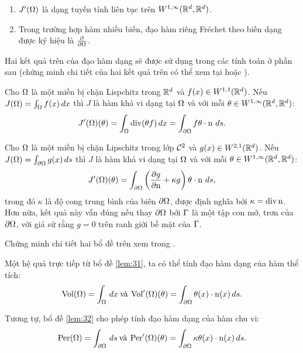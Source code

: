 \documentclass[
12pt, %
oneside, %
english, %
onehalfspacing, %
nolistspacing, %
headsepline, %
addchap,
]{MastersDoctoralThesis} %
\begin{document}
\begin{rem}\leavevmode
\begin{enumerate}[noitemsep,topsep=0pt]
	\item $J'(\Omega)$ là dạng tuyến tính liên tục trên $W^{1,\infty}(\mathbb R^d,\mathbb R^d)$.
	\item Trong trường hợp hàm nhiều biến, đạo hàm riêng Fr\'echet theo biến dạng được ký hiệu là $\frac{\partial}{\partial{\Omega}}$.
\end{enumerate}
\end{rem}

Hai kết quả trên của đạo hàm dạng sẽ được sử dụng trong các tính toán ở phần sau (chứng minh chi tiết của hai kết quả trên có thể xem tại \cite{AJT04} hoặc \cite{HP18}).

\begin{lem} \label{lem:31}
Cho $\Omega$ là một miền bị chặn Lispchitz trong $\mathbb R^d$ và $f(x) \in W^{1,1}(\mathbb R^d)$. Nếu $J(\Omega)=\int_{\Omega}f(x)\,dx$ thì $J$ là hàm khả vi dạng tại $\Omega$ và với mỗi $\theta \in W^{1,\infty}(\mathbb R^d,\mathbb R^d)$:
$$J'(\Omega)(\theta)=\int_{\Omega} \operatorname{div} (\theta f)\,dx=\int_{\partial{\Omega}} f \theta\cdot\operatorname{n} \,ds. $$
\end{lem}

\begin{lem}\label{lem:32}
Cho $\Omega$ là một miền bị chặn Lipschitz trong lớp $\mathcal C^2$ và $g(x) \in W^{2,1}(\mathbb R^d)$. Nếu $J(\Omega)=\int_{\partial{\Omega}}g(x)\,ds$ thì $J$ là hàm khả vi dạng tại $\Omega$ và với mỗi $\theta \in W^{1,\infty}(\mathbb R^d,\mathbb R^d)$:
$$ J'(\Omega)(\theta)=\int_{\partial{\Omega}} \left( \frac{\partial{g}}{\partial{\operatorname{n}}}+\kappa g \right) \theta\cdot\operatorname{n} \,ds, $$
trong đó $\kappa$ là độ cong trung bình của biên $\partial{\Omega}$, được định nghĩa bởi $\kappa= \operatorname{div} \operatorname{n}$.
Hơn nữa, kết quả này vẫn đúng nếu thay $\partial{\Omega}$ bởi $\Gamma$ là một tập con mở, trơn của $\partial{\Omega}$, với giả sử rằng $g = 0$ trên ranh giới bề mặt của $\Gamma$.
\end{lem}
Chứng minh chi tiết hai bổ đề trên xem trong \cite{HP18}.
\begin{rem}
Một hệ quả trực tiếp từ bổ đề \eqref{lem:31}, ta có thể tính đạo hàm dạng của hàm thể tích:
\begin{equation}\label{eq:volD}
\operatorname{Vol}(\Omega)=\int_\Omega \,dx \: \text{và} \: \operatorname{Vol}'(\Omega)(\theta)=\int_{\partial\Omega}\theta(x)\cdot\operatorname{n}(x)\,ds.
\end{equation}

Tương tự, bổ đề \eqref{lem:32} cho phép tính đạo hàm dạng của hàm chu vi:
\begin{equation} \label{eq:perD}
\operatorname{Per}(\Omega)=\int_{\partial \Omega} \,ds \: \text{và} \: \operatorname{Per}'(\Omega)(\theta)=\int_{\partial\Omega}\kappa \theta(x)\cdot\operatorname{n}(x)\,ds.
\end{equation}
\end{rem}
\end{document}
